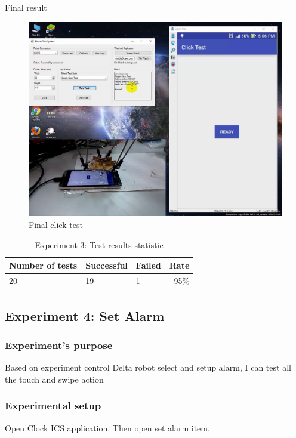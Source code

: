 Final result
	\begin{figure}[H]
		\centering
		\includegraphics[width=\maxwidth{15cm}, keepaspectratio]{Chapters/Fig/click_final.png}
		\caption{Final click test}
		\label{fig:click_final}
	\end{figure}
\begin{table}[H]
	\centering
	\caption{Experiment 3: Test results statistic}	
	\label{tab:result_stat}
	\begin{tabular}{|lll|r|}
		\hline
		\textbf{Number of tests} & \textbf{Successful} & \textbf{Failed} & \textbf{Rate} \\
		\hline
		20 & 19 & 1 & 95$\%$\\
		\hline
	\end{tabular}
\end{table}
\subsection{Experiment 4: Set Alarm}
\subsubsection{Experiment's purpose}
Based on experiment control Delta robot select and setup alarm, I can test all the touch and swipe action
\subsubsection{Experimental setup}
Open Clock ICS application. Then open set alarm item.

